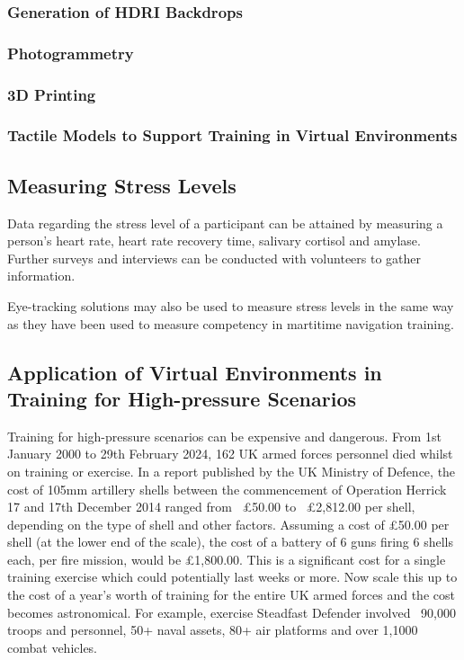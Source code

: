 \documentclass[12pt]{article}
\begin{document}
\subsubsection{Generation of HDRI Backdrops}

\subsubsection{Photogrammetry}

\subsubsection{3D Printing}

\subsubsection{Tactile Models to Support Training in Virtual Environments}

\subsection{Measuring Stress Levels}

Data regarding the stress level of a participant can be attained by measuring a person's heart rate, heart rate recovery time, salivary cortisol and amylase. Further surveys and interviews can be conducted with volunteers to gather information. \cite{liu2018impact}

Eye-tracking solutions may also be used to measure stress levels in the same way as they have been used to measure competency in martitime navigation training. \cite{atik2019use}

\subsection{Application of Virtual Environments in Training for High-pressure Scenarios} \label{sec:applicationsOfVirtualEnvironments}

Training for high-pressure scenarios can be expensive and dangerous. From 1st January 2000 to 29th February 2024, 162 UK armed forces personnel died whilst on training or exercise. \cite{ukmod2024} In a report published by the UK Ministry of Defence, the cost of 105mm artillery shells between the commencement of Operation Herrick 17 and 17th December 2014 ranged from ~£50.00 to ~£2,812.00 per shell, depending on the type of shell and other factors. \cite{ukmod2015} Assuming a cost of £50.00 per shell (at the lower end of the scale), the cost of a battery of 6 guns firing 6 shells each, per fire mission, would be £1,800.00. This is a significant cost for a single training exercise which could potentially last weeks or more. Now scale this up to the cost of a year's worth of training for the entire UK armed forces and the cost becomes astronomical. For example, exercise Steadfast Defender involved ~90,000 troops and personnel, 50+ naval assets, 80+ air platforms and over 1,1000 combat vehicles. \cite{steadfastdefender24}
\end{document}
